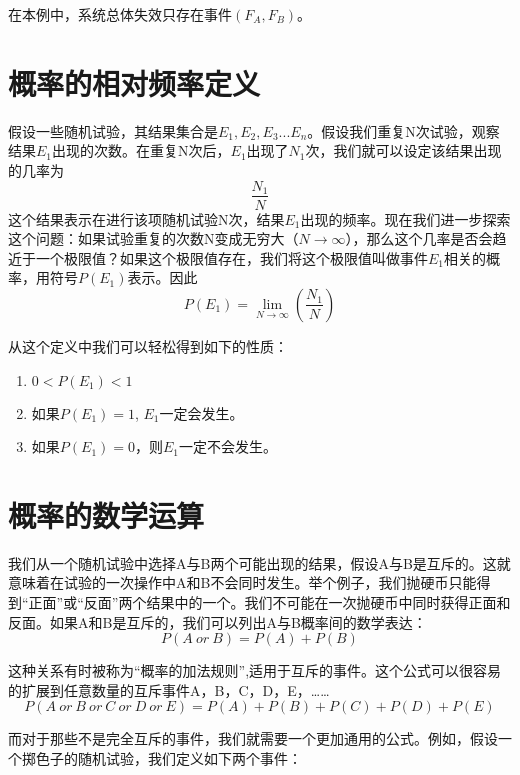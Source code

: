 \documentclass[cn,11pt,chinese]{elegantbook}
\begin{document}
在本例中，系统总体失效只存在事件$(F_A,F_B)$。

\section{概率的相对频率定义}

假设一些随机试验，其结果集合是$E_1,E_2,E_3...E_n$。假设我们重复N次试验，观察结果$E_1$出现的次数。在重复N次后，$E_1$出现了$N_1$次，我们就可以设定该结果出现的几率为
$$\frac{N_1}{N}$$
这个结果表示在进行该项随机试验N次，结果$E_1$出现的频率。现在我们进一步探索这个问题：如果试验重复的次数N变成无穷大（$N\to \infty$），那么这个几率是否会趋近于一个极限值？如果这个极限值存在，我们将这个极限值叫做事件$E_1$相关的概率，用符号$P(E_1)$表示。因此
\begin{equation}
P(E_1)=\lim_{N \to \infty}(\frac{N_1}{N})
\label{eq:eq1}
\end{equation}

从这个定义中我们可以轻松得到如下的性质：

\begin{enumerate}
	\item $0<P(E_1)<1$
	\item 如果$P(E_1)=1$, $E_1$一定会发生。
	\item 如果$P(E_1)=0$，则$E_1$一定不会发生。
\end{enumerate}

\section{概率的数学运算}

我们从一个随机试验中选择A与B两个可能出现的结果，假设A与B是互斥的。这就意味着在试验的一次操作中A和B不会同时发生。举个例子，我们抛硬币只能得到“正面”或“反面”两个结果中的一个。我们不可能在一次抛硬币中同时获得正面和反面。如果A和B是互斥的，我们可以列出A与B概率间的数学表达：
\begin{equation}
P(A\ or \ B)=P(A)+P(B)
\label{eq:eq2}
\end{equation}

这种关系有时被称为“概率的加法规则”,适用于互斥的事件。这个公式可以很容易的扩展到任意数量的互斥事件A，B，C，D，E，……
\begin{equation}
	P(A\ or\ B \ or \ C \ or\ D\ or \ E)=P(A)+P(B)+P(C)+P(D)+P(E) 
	\label{eq:eq3}
\end{equation}

而对于那些不是完全互斥的事件，我们就需要一个更加通用的公式。例如，假设一个掷色子的随机试验，我们定义如下两个事件：
\end{document}

